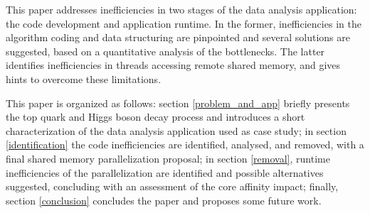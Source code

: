This paper addresses inefficiencies in two stages of the data analysis application: the code development and application runtime. In the former, inefficiencies in the algorithm coding and data structuring are pinpointed and several solutions are suggested, based on a quantitative analysis of the bottlenecks. The latter identifies inefficiencies in threads accessing remote shared memory, and gives hints to overcome these limitations.

This paper is organized as follows: section \ref{problem_and_app} briefly presents the top quark and Higgs boson decay process and introduces a short characterization of the data analysis application used as case study; in section \ref{identification} the code inefficiencies are identified, analysed, and removed, with a final shared memory parallelization proposal; in section \ref{removal}, runtime inefficiencies of the parallelization are identified and possible alternatives suggested, concluding with an assessment of the core affinity impact; finally, section \ref{conclusion} concludes the paper and proposes some future work.
